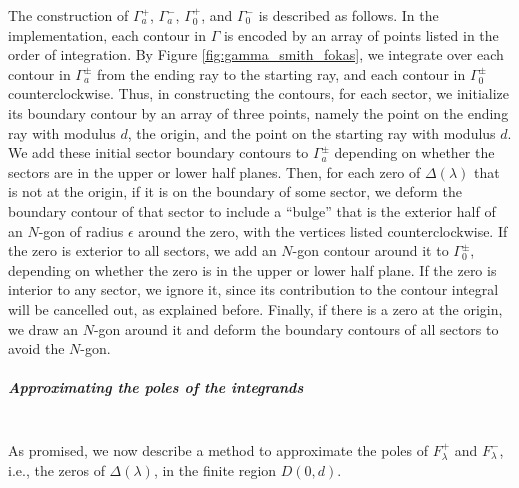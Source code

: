 \documentclass[12pt, oneside, a4paper]{article}
\begin{document}
The construction of $\Gamma_a^+$, $\Gamma_a^-$, $\Gamma_0^+$, and $\Gamma_0^-$ is described as follows. In the implementation, each contour in $\Gamma$ is encoded by an array of points listed in the order of integration. By Figure \ref{fig:gamma_smith_fokas}, we integrate over each contour in $\Gamma_a^\pm$ from the ending ray to the starting ray, and each contour in $\Gamma_0^\pm$ counterclockwise. Thus, in constructing the contours, for each sector, we initialize its boundary contour by an array of three points, namely the point on the ending ray with modulus $d$, the origin, and the point on the starting ray with modulus $d$. We add these initial sector boundary contours to $\Gamma_a^\pm$ depending on whether the sectors are in the upper or lower half planes. Then, for each zero of $\Delta(\lambda)$ that is not at the origin, if it is on the boundary of some sector, we deform the boundary contour of that sector to include a ``bulge'' that is the exterior half of an $N$-gon of radius $\epsilon$ around the zero, with the vertices listed counterclockwise. If the zero is exterior to all sectors, we add an $N$-gon contour around it to $\Gamma_0^{\pm}$, depending on whether the zero is in the upper or lower half plane. If the zero is interior to any sector, we ignore it, since its contribution to the contour integral will be cancelled out, as explained before. Finally, if there is a zero at the origin, we draw an $N$-gon around it and deform the boundary contours of all sectors to avoid the $N$-gon. 

\noindent\subparagraph{Approximating the poles of the integrands}\mbox{}\label{par:approximating_integrand_poles}\\
As promised, we now describe a method to approximate the poles of $F^+_\lambda$ and $F^-_\lambda$, i.e., the zeros of $\Delta(\lambda)$, in the finite region $D(0,d)$.
\end{document}
